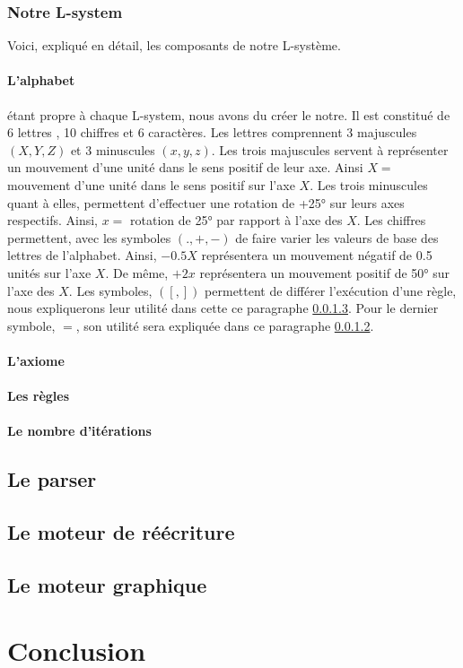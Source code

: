 \documentclass[12pt]{article}
\begin{document}
\subsubsection{Notre L-system}
Voici, expliqué en détail, les composants de notre L-système. 
\paragraph{L'alphabet}\label{alpha} étant propre à chaque L-system, nous avons du créer le notre.
Il est constitué de 6 lettres , 10 chiffres et 6 caractères.
Les lettres comprennent 3 majuscules $(X,Y,Z)$ et 3 minuscules $(x,y,z)$.
Les trois majuscules servent à représenter un mouvement d'une unité dans le sens positif de leur axe.
Ainsi $X = $ mouvement d'une unité dans le sens positif sur l'axe $X$.
Les trois minuscules quant à elles, permettent d'effectuer une rotation de +25° sur leurs axes respectifs.
Ainsi, $x = $ rotation de 25° par rapport à l'axe des $X$.
Les chiffres permettent, avec les symboles $(.,+,-)$ de faire varier les valeurs de base des lettres de l'alphabet.
Ainsi, $-0.5X$ représentera un mouvement négatif de 0.5 unités sur l'axe $X$.
De même, $+2x$ représentera un mouvement positif de 50° sur l'axe des $X$.
Les symboles, $([,])$ permettent de différer l'exécution d'une règle, nous expliquerons leur utilité dans cette ce paragraphe \ref{rules}. Pour le dernier symbole, $=$, son utilité sera expliquée dans ce paragraphe \ref{axiome}.
\paragraph{L'axiome}\label{axiome}
\paragraph{Les règles}\label{rules}
\paragraph{Le nombre d'itérations}\label{nbIt}
\subsection{Le parser}
\label{parser}
\subsection{Le moteur de réécriture}
\label{rw-engine}
\subsection{Le moteur graphique}
\label{g-engine}





\section{Conclusion}
\end{document}
